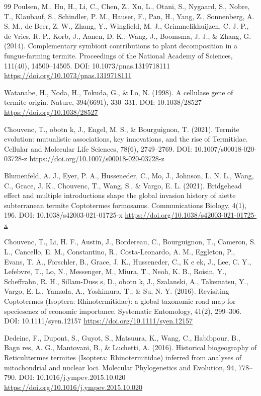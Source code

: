\documentclass[10pt,letterpaper]{article}
\begin{document}
\begin{thebibliography}{99}
 Poulsen, M., Hu, H., Li, C., Chen, Z., Xu, L., Otani, S., Nygaard, S., Nobre, T., Klaubauf, S., Schindler, P. M., Hauser, F., Pan, H., Yang, Z., Sonnenberg, A. S. M., de Beer, Z. W., Zhang, Y., Wingfield, M. J., Grimmelikhuijzen, C. J. P., de Vries, R. P., Korb, J., Aanen, D. K., Wang, J., Boomsma, J. J., \& Zhang, G. (2014). Complementary symbiont contributions to plant decomposition in a fungus-farming termite. Proceedings of the National Academy of Sciences, 111(40), 14500--14505. DOI: 10.1073/pnas.1319718111 \url{https://doi.org/10.1073/pnas.1319718111}

 Watanabe, H., Noda, H., Tokuda, G., \& Lo, N. (1998). A cellulase gene of termite origin. Nature, 394(6691), 330--331. DOI: 10.1038/28527 \url{https://doi.org/10.1038/28527}

 Chouvenc, T.,  obotn k, J., Engel, M. S., \& Bourguignon, T. (2021). Termite evolution: mutualistic associations, key innovations, and the rise of Termitidae. Cellular and Molecular Life Sciences, 78(6), 2749--2769. DOI: 10.1007/s00018-020-03728-z \url{https://doi.org/10.1007/s00018-020-03728-z}

 Blumenfeld, A. J., Eyer, P. A., Husseneder, C., Mo, J., Johnson, L. N. L., Wang, C., Grace, J. K., Chouvenc, T., Wang, S., \& Vargo, E. L. (2021). Bridgehead effect and multiple introductions shape the global invasion history of aiette subterranean termite Coptotermes formosanus. Communications Biology, 4(1), 196. DOI: 10.1038/s42003-021-01725-x \url{https://doi.org/10.1038/s42003-021-01725-x}

 Chouvenc, T., Li, H. F., Austin, J., Bordereau, C., Bourguignon, T., Cameron, S. L., Cancello, E. M., Constantino, R., Costa-Leonardo, A. M., Eggleton, P., Evans, T. A., Forschler, B., Grace, J. K., Husseneder, C., K e ek, J., Lee, C. Y., Lefebvre, T., Lo, N., Messenger, M., Miura, T., Neoh, K. B., Roisin, Y., Scheffrahn, R. H., Sillam-Duss s, D.,  obotn k, J., Szalanski, A., Takematsu, Y., Vargo, E. L., Yamada, A., Yoshimura, T., \& Su, N. Y. (2016). Revisiting Coptotermes (Isoptera: Rhinotermitidae): a global taxonomic road map for speciesenez of economic importance. Systematic Entomology, 41(2), 299--306. DOI: 10.1111/syen.12157 \url{https://doi.org/10.1111/syen.12157}

 Dedeine, F., Dupont, S., Guyot, S., Matsuura, K., Wang, C., Habibpour, B., Bagn res, A. G., Mantovani, B., \& Luchetti, A. (2016). Historical biogeography of Reticulitermes termites (Isoptera: Rhinotermitidae) inferred from analyses of mitochondrial and nuclear loci. Molecular Phylogenetics and Evolution, 94, 778--790. DOI: 10.1016/j.ympev.2015.10.020 \url{https://doi.org/10.1016/j.ympev.2015.10.020}


\end{thebibliography}
\end{document}
